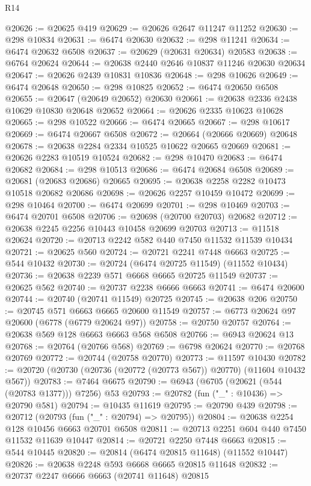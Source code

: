 \begin{lexlean}{R14}
\begin{coremodule}
@20626 := @20625 @419
@20629 := @20626 @2647 @11247 @11252
@20630 := @298 @10834
@20631 := @6474 @20630
@20632 := @298 @11241
@20634 := @6474 @20632 @6508
@20637 := @20629 (@20631 @20634) @20583
@20638 := @6764 @20624
@20644 := @20638 @2440 @2646 @10837 @11246 @20630 @20634
@20647 := @20626 @2439 @10831 @10836
@20648 := @298 @10626
@20649 := @6474 @20648
@20650 := @298 @10825
@20652 := @6474 @20650 @6508
@20655 := @20647 (@20649 @20652) @20630
@20661 := @20638 @2336 @2438 @10629 @10830 @20648 @20652
@20664 := @20626 @2335 @10623 @10628
@20665 := @298 @10522
@20666 := @6474 @20665
@20667 := @298 @10617
@20669 := @6474 @20667 @6508
@20672 := @20664 (@20666 @20669) @20648
@20678 := @20638 @2284 @2334 @10525 @10622 @20665 @20669
@20681 := @20626 @2283 @10519 @10524
@20682 := @298 @10470
@20683 := @6474 @20682
@20684 := @298 @10513
@20686 := @6474 @20684 @6508
@20689 := @20681 (@20683 @20686) @20665
@20695 := @20638 @2258 @2282 @10473 @10518 @20682 @20686
@20698 := @20626 @2257 @10459 @10472
@20699 := @298 @10464
@20700 := @6474 @20699
@20701 := @298 @10469
@20703 := @6474 @20701 @6508
@20706 := @20698 (@20700 @20703) @20682
@20712 := @20638 @2245 @2256 @10443 @10458 @20699 @20703
@20713 := @11518 @20624
@20720 := @20713 @2242 @582 @440 @7450 @11532 @11539 @10434
@20721 := @20625 @560
@20724 := @20721 @2241 @7448 @6663
@20725 := @544 @10432
@20730 := @20724 (@6474 @20725 @11549) (@11552 @10434)
@20736 := @20638 @2239 @571 @6668 @6665 @20725 @11549
@20737 := @20625 @562
@20740 := @20737 @2238 @6666 @6663
@20741 := @6474 @20600
@20744 := @20740 (@20741 @11549) @20725
@20745 := @20638 @206
@20750 := @20745 @571 @6663 @6665 @20600 @11549
@20757 := @6773 @20624 @97 @20600 (@6778 (@6779 @20624 @97))
@20758 := @20750 @20757
@20764 := @20638 @569 @128 @6663 @6663 @568 @6508
@20766 := @6943 @20624 @13
@20768 := @20764 (@20766 @568)
@20769 := @6798 @20624
@20770 := @20768 @20769
@20772 := @20744 (@20758 @20770)
@20773 := @11597 @10430
@20782 := @20720 (@20730 (@20736 (@20772 (@20773 @567)) @20770) (@11604 @10432 @567))
@20783 := @7464 @6675
@20790 := @6943 (@6705 (@20621 (@544 (@20783 @1377))) @7256) @53
@20793 := @20782 (fun ("_" : @10436) => @20790 @581)
@20794 := @10435 @11619
@20795 := @20790 @439
@20798 := @20712 (@20793 (fun ("_" : @20794) => @20795))
@20804 := @20638 @2254 @128 @10456 @6663 @20701 @6508
@20811 := @20713 @2251 @604 @440 @7450 @11532 @11639 @10447
@20814 := @20721 @2250 @7448 @6663
@20815 := @544 @10445
@20820 := @20814 (@6474 @20815 @11648) (@11552 @10447)
@20826 := @20638 @2248 @593 @6668 @6665 @20815 @11648
@20832 := @20737 @2247 @6666 @6663 (@20741 @11648) @20815

\end{coremodule}
\end{lexlean}
